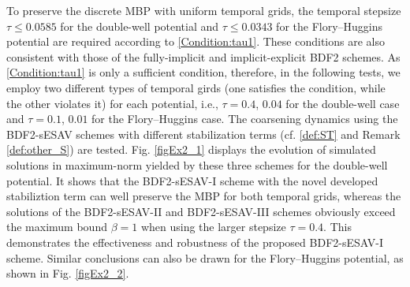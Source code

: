 \documentclass{m2an}
\begin{document}
To preserve the discrete MBP with uniform temporal grids, the temporal stepsize $ \tau \le 0.0585 $ for the double-well potential and $ \tau \le 0.0343 $ for the Flory--Huggins potential are required according to \eqref{Condition:tau1}. These conditions are also consistent with those of the fully-implicit \cite{SINUM_2020_Liao} and implicit-explicit \cite{MOC_2023_Ju} BDF2 schemes. As \eqref{Condition:tau1} is only a sufficient condition, therefore, in the following tests, we employ two different types of temporal girds (one satisfies the condition, while the other violates it) for each potential, i.e., $ \tau = 0.4 $, $ 0.04 $ for the double-well case and $ \tau = 0.1 $, $ 0.01 $ for the Flory--Huggins case. The coarsening dynamics using the BDF2-sESAV schemes with different stabilization terms (cf. \eqref{def:ST} and Remark \ref{def:other_S}) are tested. Fig. \ref{figEx2_1} displays the evolution of  simulated  solutions in maximum-norm  yielded by these three schemes for the double-well potential. It shows that the BDF2-sESAV-I scheme with the novel developed stabiliztion term can well preserve the MBP for both temporal grids, whereas the solutions of the BDF2-sESAV-II and BDF2-sESAV-III schemes obviously exceed the maximum bound $ \beta=1 $ when using the larger stepsize $ \tau = 0.4 $. This demonstrates the effectiveness and robustness of the proposed BDF2-sESAV-I scheme. Similar conclusions can also be drawn for the Flory--Huggins potential, as shown in Fig. \ref{figEx2_2}.
\end{document}
